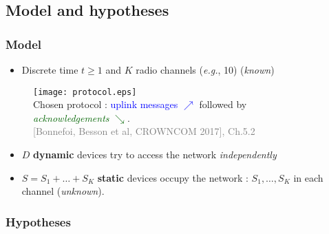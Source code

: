 \subsection{Model and hypotheses}

\subsubsection{Model}

\begin{frameO}[Model]

    \begin{itemize}
        \item
              Discrete time \(t\geq1\) and \(K\) radio channels (\emph{e.g.}, 10)
              \hfill{} (\emph{known})
    \end{itemize}

    \begin{figure}[h!]
        \centering
        \texttt{[image: protocol.eps]}\\
        
        {\small Chosen protocol : \textcolor{blue}{uplink messages {\Large $\nearrow$}} followed by \textcolor{darkgreen}{\emph{acknowledgements} {\Large $\searrow$}}.}\\
        \hfill{} {\tiny \textcolor{gray}{[Bonnefoi, Besson et al, CROWNCOM 2017], Ch.5.2}}
    \end{figure}

    \begin{itemize}
        \item
              \(D\) \textbf{dynamic} devices try to access the network
              \emph{independently}
        \item
              \(S=S_1+\dots+S_{K}\) \textbf{static} devices occupy the network :
              \newline
              \(S_1,\dots,S_{K}\) in each channel \hfill{} (\emph{unknown}).
    \end{itemize}

\end{frameO}



\subsubsection{Hypotheses}

